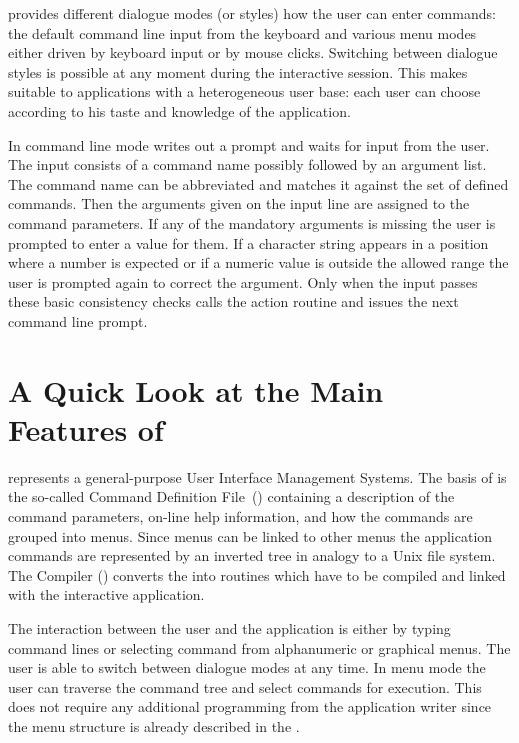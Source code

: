 \KUIP{} provides different dialogue modes (or styles) how the user can
enter commands:
the default command line input from the keyboard and
various menu modes either driven by keyboard input or by mouse clicks.
Switching between dialogue styles is possible at any moment
during the interactive session.
This makes \KUIP{} suitable to applications with a heterogeneous user
base:
each user can choose according to his taste and knowledge of the
application.

In command line mode \KUIP{} writes out a prompt and waits for input
from the user. 
The input consists of a command name possibly followed by an argument
list.
The command name can be abbreviated and \KUIP{} matches it
against the set of defined commands.
Then the arguments given on the input line are
assigned to the command parameters.
If any of the mandatory arguments is missing the user is prompted to
enter a value for them.
If a character string appears in a position where a number is expected
or if a numeric value is outside the allowed range the user is
prompted again to correct the argument.
Only when the input passes these basic consistency checks \KUIP{}
calls the action routine and issues the next command line prompt.
 
\section{A Quick Look at the Main Features of \KUIP{}}

\KUIP{} represents a general-purpose User Interface Management Systems.
The basis of \KUIP{} is the so-called
Command Definition File~(\CDF{}) containing a description of the command
parameters, on-line help information, and how the commands are grouped
into menus.
Since menus can be linked to other menus the application commands are
represented by an inverted tree in analogy to a Unix file system. 
The \KUIP{} Compiler (\KUIPC{}) converts the \CDF{} into routines which
have to be compiled and linked with the interactive application.

The interaction between the user and the application is either
by typing command lines or selecting command from alphanumeric or
graphical menus. 
The user is able to switch between dialogue modes at any time.
In menu mode the user can traverse the command tree and select commands
for execution.
This does not require any additional programming from the application
writer since the menu structure is already described in the \CDF{}.

